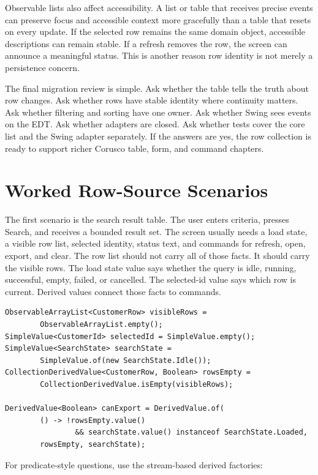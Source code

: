 Observable lists also affect accessibility. A list or table that receives
precise events can preserve focus and accessible context more gracefully than a
table that resets on every update. If the selected row remains the same domain
object, accessible descriptions can remain stable. If a refresh removes the row,
the screen can announce a meaningful status. This is another reason row identity
is not merely a persistence concern.

The final migration review is simple. Ask whether the table tells the truth
about row changes. Ask whether rows have stable identity where continuity
matters. Ask whether filtering and sorting have one owner. Ask whether Swing sees
events on the EDT. Ask whether adapters are closed. Ask whether tests cover the
core list and the Swing adapter separately. If the answers are yes, the row
collection is ready to support richer Corusco table, form, and command chapters.

\section{Worked Row-Source Scenarios}

The first scenario is the search result table. The user enters criteria, presses
Search, and receives a bounded result set. The screen usually needs a load state,
a visible row list, selected identity, status text, and commands for refresh,
open, export, and clear. The row list should not carry all of those facts. It
should carry the visible rows. The load state value says whether the query is
idle, running, successful, empty, failed, or cancelled. The selected-id value
says which row is current. Derived values connect those facts to commands.

\begin{lstlisting}[caption={Search screen state around a visible row list.}]
ObservableArrayList<CustomerRow> visibleRows =
        ObservableArrayList.empty();
SimpleValue<CustomerId> selectedId = SimpleValue.empty();
SimpleValue<SearchState> searchState =
        SimpleValue.of(new SearchState.Idle());
CollectionDerivedValue<CustomerRow, Boolean> rowsEmpty =
        CollectionDerivedValue.isEmpty(visibleRows);

DerivedValue<Boolean> canExport = DerivedValue.of(
        () -> !rowsEmpty.value()
                && searchState.value() instanceof SearchState.Loaded,
        rowsEmpty, searchState);
\end{lstlisting}

For predicate-style questions, use the stream-based derived factories:

